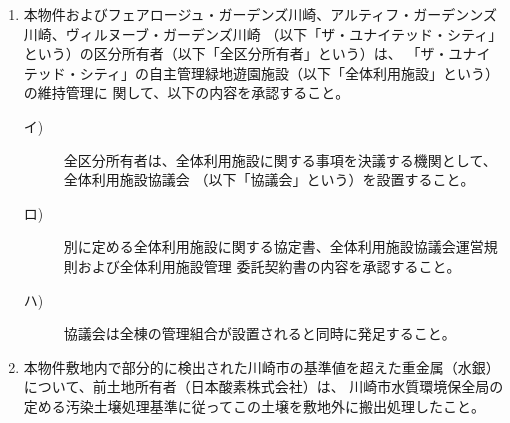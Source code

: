 \documentclass[
  luatex,
  paper=a4paper,
  fontsize=11pt,
  jafontsize=10pt,
  jlreq_notes,
]{jlreq}
\begin{document}
\begin{enumerate}
  \item 本物件およびフェアロージュ・ガーデンズ川崎、アルティフ・ガーデンンズ川崎、ヴィルヌーブ・ガーデンズ川崎
        （以下「ザ・ユナイテッド・シティ」という）の区分所有者（以下「全区分所有者」という）は、
        「ザ・ユナイテッド・シティ」の自主管理緑地遊園施設（以下「全体利用施設」という）の維持管理に
         関して、以下の内容を承認すること。
  \begin{description}
  \item [イ)]全区分所有者は、全体利用施設に関する事項を決議する機関として、全体利用施設協議会
        （以下「協議会」という）を設置すること。
  \item [ロ)]別に定める全体利用施設に関する協定書、全体利用施設協議会運営規則および全体利用施設管理
        委託契約書の内容を承認すること。
  \item [ハ)]協議会は全棟の管理組合が設置されると同時に発足すること。
  \end{description}
  \item 本物件敷地内で部分的に検出された川崎市の基準値を超えた重金属（水銀）について、前土地所有者（日本酸素株式会社）は、
        川崎市水質環境保全局の定める汚染土壌処理基準に従ってこの土壌を敷地外に搬出処理したこと。
  \end{enumerate}
  
  \newpage
  
\end{document}
